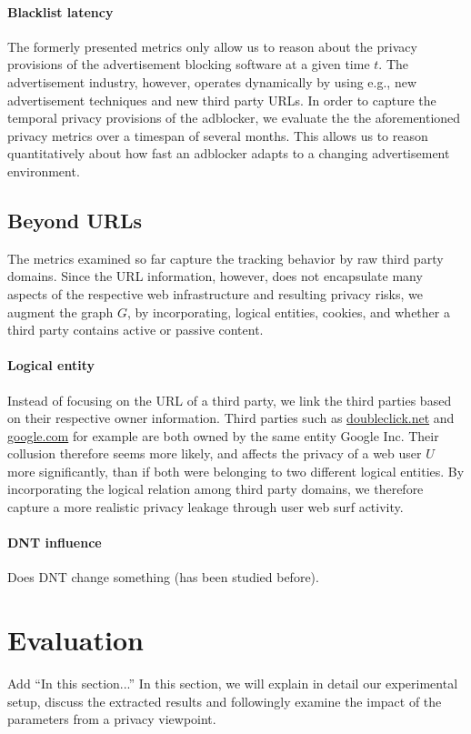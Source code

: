 \documentclass{sig-alternate}
\begin{document}
\paragraph{Blacklist latency}
The formerly presented metrics only allow us to reason about the privacy provisions of the advertisement blocking software at a given time $t$. The advertisement industry, however, operates dynamically by using e.g., new advertisement techniques and new third party URLs. In order to capture the temporal privacy provisions of the adblocker, we evaluate the the aforementioned privacy metrics over a timespan of several months. This allows us to reason quantitatively about how fast an adblocker adapts to a changing advertisement environment.

\subsection{Beyond URLs}
The metrics examined so far capture the tracking behavior by raw third party domains. Since the URL information, however, does not encapsulate many aspects of the respective web infrastructure and resulting privacy risks, we augment the graph $G$, by incorporating, logical entities, cookies, and whether a third party contains active or passive content.

\paragraph{Logical entity}
\label{sec:logical_entity}
Instead of focusing on the URL of a third party, we link the third parties based on their respective owner information. Third parties such as \url{doubleclick.net} and \url{google.com} for example are both owned by the same entity Google Inc. Their collusion therefore seems more likely, and affects the privacy of a web user $U$ more significantly, than if both were belonging to two different logical entities. By incorporating the logical relation among third party domains, we therefore capture a more realistic privacy leakage through user web surf activity.

\paragraph{DNT influence}
Does DNT change something (has been studied before).

\section{Evaluation}
{\color{red}Add ``In this section...''}
{\color{blue}In this section, we will explain in detail our experimental setup, discuss the extracted results and followingly examine the impact of the parameters from a privacy viewpoint.}
\end{document}
